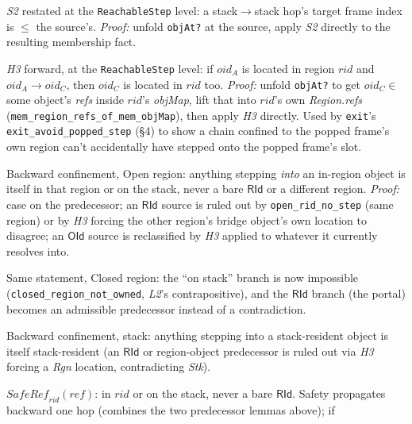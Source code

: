 \documentclass[11pt]{article}
\newcommand{\op}[1]{\texttt{#1}}
\newcommand{\thm}[1]{\textbf{\texttt{#1}}}
\begin{document}
\begin{description}[nosep]
  \item[\thm{stack\_step\_index\_le}] \textit{S2} restated at the \texttt{ReachableStep} level: a
    stack$\to$stack hop's target frame index is $\le$ the source's. \emph{Proof:} unfold
    \texttt{objAt?} at the source, apply \textit{S2} directly to the resulting membership fact.
  \item[\thm{successor\_of\_region\_object}] \textit{H3} forward, at the \texttt{ReachableStep}
    level: if $oid_A$ is located in region $rid$ and $oid_A \to oid_C$, then $oid_C$ is located in
    $rid$ too. \emph{Proof:} unfold \texttt{objAt?} to get $oid_C \in$ some object's \textit{refs}
    inside $rid$'s \textit{objMap}, lift that into $rid$'s own \textit{Region.refs}
    (\texttt{mem\_region\_refs\_of\_mem\_objMap}), then apply \textit{H3} directly. Used by
    \op{exit}'s \texttt{exit\_avoid\_popped\_step} (\S4) to show a chain confined to the popped
    frame's own region can't accidentally have stepped onto the popped frame's slot.
  \item[\thm{predecessor\_of\_region\_object}] Backward confinement, Open region: anything
    stepping \emph{into} an in-region object is itself in that region or on the stack, never a bare
    $\mathsf{RId}$ or a different region. \emph{Proof:} case on the predecessor; an $\mathsf{RId}$
    source is ruled out by \texttt{open\_rid\_no\_step} (same region) or by \textit{H3} forcing the
    other region's bridge object's own location to disagree; an $\mathsf{OId}$ source is
    reclassified by \textit{H3} applied to whatever it currently resolves into.
  \item[\thm{predecessor\_of\_closed\_region\_object}] Same statement, Closed region: the ``on
    stack'' branch is now impossible (\texttt{closed\_region\_not\_owned}, \textit{L2}'s
    contrapositive), and the $\mathsf{RId}$ branch (the portal) becomes an admissible predecessor
    instead of a contradiction.
  \item[\thm{predecessor\_of\_stack\_object}] Backward confinement, stack: anything stepping into a
    stack-resident object is itself stack-resident (an $\mathsf{RId}$ or region-object predecessor
    is ruled out via \textit{H3} forcing a \textit{Rgn} location, contradicting \textit{Stk}).
  \item[\thm{SafeRef} / \thm{predecessor\_safe} / \thm{safe\_reflTransGen\_transport}]
    $\mathit{SafeRef}_{rid}(ref)$: in $rid$ or on the stack, never a bare $\mathsf{RId}$. Safety
    propagates backward one hop (combines the two predecessor lemmas above); if

\end{description}
\end{document}

